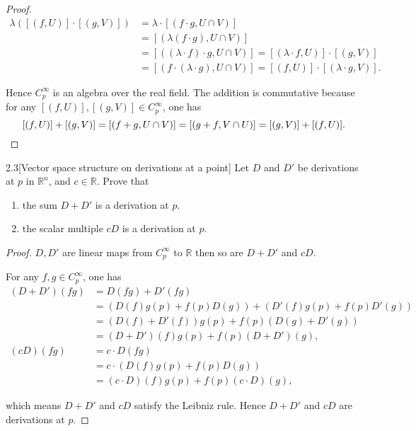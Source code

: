 \begin{proof}
\begin{align*}
		\lambda([(f, U)]\cdot [(g, V)])                     & = \lambda\cdot[(f\cdot g, U\cap V)]                                           \\
		                                                    & = [(\lambda(f\cdot g), U\cap V)]                                              \\
		                                                    & = [((\lambda\cdot f)\cdot g, U\cap V)] = [(\lambda\cdot f, U)]\cdot [(g, V)]  \\
		                                                    & = [(f\cdot (\lambda\cdot g), U\cap V)] = [(f, U)]\cdot [(\lambda\cdot g, V)].
	\end{align*}
	\endgroup

	Hence \( C^{\infty}_{p} \) is an algebra over the real field. The addition is commutative because for any \( [(f, U)], [(g, V)] \in C^{\infty}_{p} \), one has
	\[
		[(f, U)] + [(g, V)] = [(f + g, U\cap V)] = [(g + f, V\cap U)] = [(g, V)] + [(f, U)].\qedhere
	\]
\end{proof}

\begin{problem}{2.3}[Vector space structure on derivations at a point]
Let \( D \) and \( D' \) be derivations at \( p \) in \( \mathbb{R}^{n} \), and \( c\in \mathbb{R} \). Prove that
\begin{enumerate}[label={(\alph*)},leftmargin=*,itemsep=0pt]
	\item the sum \( D + D' \) is a derivation at \( p \).
	\item the scalar multiple \( cD \) is a derivation at \( p \).
\end{enumerate}
\end{problem}

\begin{proof}
	\( D, D' \) are linear maps from \( C^{\infty}_{p} \) to \( \mathbb{R} \) then so are \( D + D' \) and \( cD \).

	For any \( f, g \in C^{\infty}_{p} \), one has
	\begingroup
	\allowdisplaybreaks%
	\begin{align*}
		(D + D')(fg) & = D(fg) + D'(fg)                                  \\
		             & = (D(f)g(p) + f(p)D(g)) + (D'(f)g(p) + f(p)D'(g)) \\
		             & = (D(f) + D'(f))g(p) + f(p)(D(g) + D'(g))         \\
		             & = (D + D')(f)g(p) + f(p)(D + D')(g),              \\
		(cD)(fg)     & = c\cdot D(fg)                                    \\
		             & = c\cdot (D(f)g(p) + f(p)D(g))                    \\
		             & = (c\cdot D)(f)g(p) + f(p)(c\cdot D)(g),
	\end{align*}
	\endgroup

	which means \( D + D' \) and \( cD \) satisfy the Leibniz rule. Hence \( D + D' \) and \( cD \) are derivations at \( p \).
\end{proof}

